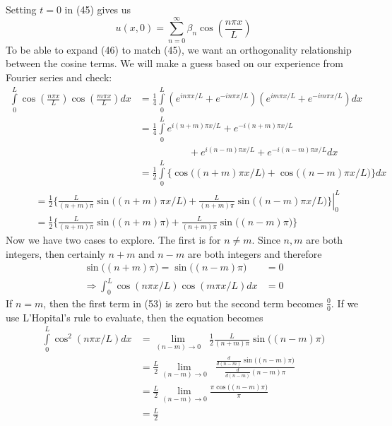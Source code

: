 \documentclass[a4paper, 11pt]{article}
\newenvironment{solution}{%
	\begin{list}{}{%
			\setlength{\topsep}{0pt}%
			\setlength{\leftmargin}{0.5cm}%
			\setlength{\rightmargin}{0.5cm}%
			\setlength{\listparindent}{\parindent}%
			\setlength{\itemindent}{\parindent}%
			\setlength{\parsep}{\parskip}%
		}%
		\item[]}{\end{list}}
\begin{document}
\begin{enumerate}[leftmargin=0em]
\begin{solution}
        Setting $t=0$ in (45) gives us
        \begin{equation}
          u(x,0) = \sum\limits_{n=0}^\infty \beta_n\cos\left(\frac{n\pi x}{L}\right)
        \end{equation}
        To be able to expand (46) to match (45), we want an
        orthogonality relationship between the cosine terms.  We will make a guess based on our
				experience from Fourier series and check:
        \begin{align}
          \int\limits_0^L \cos\left(\frac{n\pi x}{L}\right)\cos\left(\frac{m\pi x}{L}\right)dx &= \frac{1}{4}\int\limits_0^L \left( e^{in\pi x/L}+e^{-in\pi x/L} \right)\left( e^{im\pi x/L}+e^{-im\pi x/L} \right)dx \\
              &= \frac{1}{4}\int\limits_0^L e^{i(n+m)\pi x/L}+e^{-i(n+m)\pi x/L}\\
              &\hspace{5em}+e^{i(n-m)\pi x/L}+e^{-i(n-m)\pi x/L}dx \\
              &= \frac{1}{2}\int\limits_0^L\Big\{ \cos\big((n+m)\pi x/L \big) +\cos\big( (n-m)\pi x/L \big) \Big\}dx
        \end{align}
        \begin{align}
          &= \left.\frac{1}{2}\Big\{ \frac{L}{(n+m)\pi}\sin\Big((n+m)\pi x/L\Big) + \frac{L}{(n+m)\pi}\sin\Big((n-m)\pi x/L\Big)\Big\}\right\vert_0^L \\
          &= \frac{1}{2}\Big\{ \frac{L}{(n+m)\pi}\sin\Big((n+m)\pi\Big) + \frac{L}{(n+m)\pi}\sin\Big((n-m)\pi\Big)\Big\} 
        \end{align}
        Now we have two cases to explore. The first is for $n\neq m$. Since
        $n,m$ are both integers, then certainly $n+m$ and $n-m$ are both
        integers and therefore
        \begin{align}
          \sin\big((n+m)\pi\big)=\sin\big((n-m)\pi\big) &= 0  \\
          \Rightarrow \int_0^L \cos(n\pi x/L)\cos(m\pi x/L)dx &= 0 
        \end{align}
        If $n=m$, then the first term in (53) is zero but the second term
        becomes $\frac{0}{0}$. If we use L'Hopital's rule to evaluate, then the
        equation becomes
        \begin{align}
          \int\limits_0^L \cos^2(n\pi x/L)dx &= \lim\limits_{(n-m)\to 0}\;\;\frac{1}{2}\frac{L}{(n+m)\pi}\sin\big( (n-m)\pi  \big) \\
                                             &= \frac{L}{2}\lim\limits_{(n-m)\to 0}\;\; \frac{\frac{d}{d(n-m)}\sin\big( (n-m)\pi \big)}{\frac{d}{d(n-m)}(n-m)\pi} \\
                                             &= \frac{L}{2}\lim\limits_{(n-m)\to 0}\frac{\pi\cos\big((n-m)\pi\big)}{\pi} \\
          &= \frac{L}{2} 
        \end{align}


\end{solution}
\end{enumerate}
\end{document}
